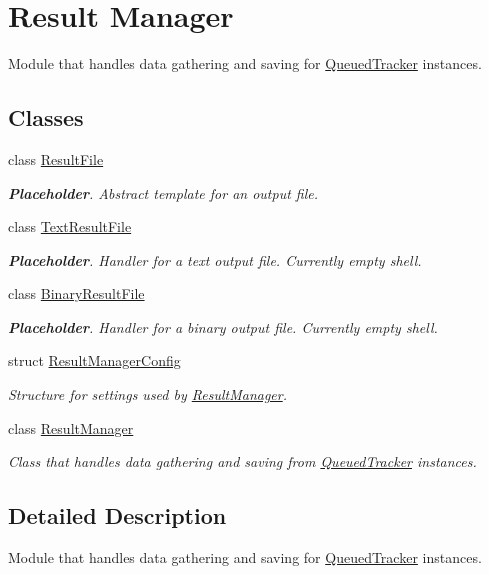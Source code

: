 \hypertarget{group___r_m}{}\section{Result Manager}
\label{group___r_m}


Module that handles data gathering and saving for \hyperlink{class_queued_tracker}{Queued\+Tracker} instances.  


\subsection*{Classes}
\begin{DoxyCompactItemize}
\item 
class \hyperlink{class_result_file}{Result\+File}
\begin{DoxyCompactList}\small\item\em {\bfseries Placeholder}. Abstract template for an output file. \end{DoxyCompactList}\item 
class \hyperlink{class_text_result_file}{Text\+Result\+File}
\begin{DoxyCompactList}\small\item\em {\bfseries Placeholder}. Handler for a text output file. Currently empty shell. \end{DoxyCompactList}\item 
class \hyperlink{class_binary_result_file}{Binary\+Result\+File}
\begin{DoxyCompactList}\small\item\em {\bfseries Placeholder}. Handler for a binary output file. Currently empty shell. \end{DoxyCompactList}\item 
struct \hyperlink{struct_result_manager_config}{Result\+Manager\+Config}
\begin{DoxyCompactList}\small\item\em Structure for settings used by \hyperlink{class_result_manager}{Result\+Manager}. \end{DoxyCompactList}\item 
class \hyperlink{class_result_manager}{Result\+Manager}
\begin{DoxyCompactList}\small\item\em Class that handles data gathering and saving from \hyperlink{class_queued_tracker}{Queued\+Tracker} instances. \end{DoxyCompactList}\end{DoxyCompactItemize}


\subsection{Detailed Description}
Module that handles data gathering and saving for \hyperlink{class_queued_tracker}{Queued\+Tracker} instances. 

